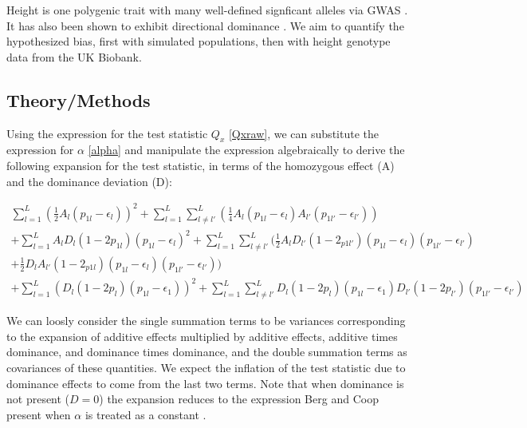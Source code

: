 \documentclass[a4paper,12pt]{article}
\begin{document}
Height is one polygenic trait with many well-defined signficant
alleles via GWAS \cite{heightselection}. It has also been shown to exhibit
directional dominance \cite{heightdirectdom}. We aim to quantify the
hypothesized bias, first with simulated populations, then with height genotype data from the UK Biobank.



\subsection*{Theory/Methods}

Using the expression for the test statistic $Q_x$ \eqref{Qxraw}, we
can substitute the expression for $\alpha$ \eqref{alpha} and manipulate
the expression algebraically to derive the following expansion for the
test statistic, in terms of the homozygous effect (A)  and the dominance
deviation (D):

\begin{equation}
  \begin{split}
  \sum^L_{l=1}( \frac{1}{2}A_l(p_{1l}-\epsilon_l))^2+\sum^L_{l=1}\sum^L_{
    l \neq l'}(\frac{1}{4}A_l(p_{1l}-\epsilon_{l})A_{l'}(p_{1l'}-\epsilon_{l'}))
  \\
  +\sum^L_{l=1}A_lD_l(1-2p_{1l})(p_{1l}-\epsilon_l)^2 +
  \sum^L_{l=1}\sum^L_{l \neq
    l'}(\frac{1}{2}A_lD_{l'}(1-2_{p1l'})(p_{1l}-\epsilon_l)(p_{1l'}-\epsilon_{l'}) \\
  + \frac{1}{2}D_lA_{l'}(1-2_{p1l})(p_{1l}-\epsilon_l)(p_{1l'}-\epsilon_{l'})) \\
   + \sum^L_{l=1} (D_l(1-2p_l)(p_{1l}-\epsilon_{1}))^2
   + \sum^L_{l=1}\sum^L_{l \neq
     l'}D_{l}(1-2p_{l})(p_{1l}-\epsilon_{1})D_{l'}(1-2p_{l'})(p_{1l'}-\epsilon_{l'}) \label{expansion}
  \end{split}
\end{equation}

We can loosly consider the single summation terms to be variances
corresponding to the expansion of additive effects multiplied by
additive effects, additive times dominance, and dominance times
dominance, and the double summation terms as covariances of these
quantities. We expect the inflation of the test statistic due to
dominance effects to come from the last two terms. Note that when
dominance is not present ($D=0$) the expansion reduces to the
expression Berg and Coop present when $\alpha$ is treated as a constant
\cite{berg}.
\end{document}
